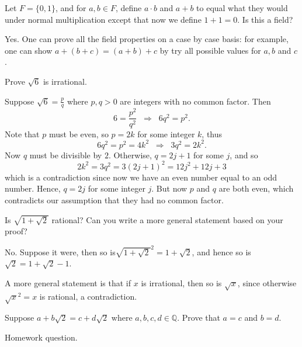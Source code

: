 \documentclass[11pt,dvipsnames]{book}
\numberwithin{figure}{section} %
\numberwithin{table}{section} %
\begin{document}
\begin{exercise}
Let $F=\{0,1\}$, and for $a,b\in F$, define $a\cdot b$ and $a+b$ to equal what they would under normal multiplication except that now we define $1+1=0$. Is this a field?
\begin{solution}
Yes. One can prove all the field properties on a case by case basis: for example, one can show $a+(b+c)=(a+b)+c$ by try all possible values for $a,b$ and $c$.
\end{solution}
\end{exercise}


\begin{exercise}
Prove $\sqrt{6}$ is irrational.
\begin{solution}
Suppose $\sqrt{6}=\frac{p}{q}$ where $p,q>0$ are integers with no common factor. Then
\[
6=\frac{p^2}{q^2} \;\; \Longrightarrow \;\;  6q^2=p^2.
\]
Note that $p$ must be even, so $p=2k$ for some integer $k$, thus
\[
6q^2=p^2=4k^2  \;\; \Longrightarrow \;\;   3q^2=2k^2.
\]
Now $q$ must be divisible by $2$. Otherwise, $q=2j+1$ for some $j$, and so 
\[
2k^2=3q^2=3(2j+1)^2=12j^2+12j+3
\]
which is a contradiction since now we have an even number equal to an odd number. Hence, $q=2j$ for some integer $j$. But now $p$ and $q$ are both even, which contradicts our assumption that they had no common factor. 

\end{solution}
\end{exercise}


\begin{exercise}
Is $\sqrt{1+\sqrt{2}}$ rational? Can you write a more general statement based on your proof?
\begin{solution}
No. Suppose it were, then so is$\sqrt{1+\sqrt{2}}^2=1+\sqrt{2}$, and hence so is $\sqrt{2}=1+\sqrt{2}-1$. 

A more general statement is that if $x$ is irrational, then so is $\sqrt{x}$, since otherwise $\sqrt{x}^2=x$ is rational, a contradiction.
\end{solution}
\end{exercise}

\begin{exercise}
Suppose $a+b\sqrt{2}=c+d\sqrt{2}$ where $a,b,c,d\in\mathbb{Q}$. Prove that $a=c$ and $b=d$. 
\begin{solution}
Homework question.
\end{solution}
\end{exercise}
\end{document}
